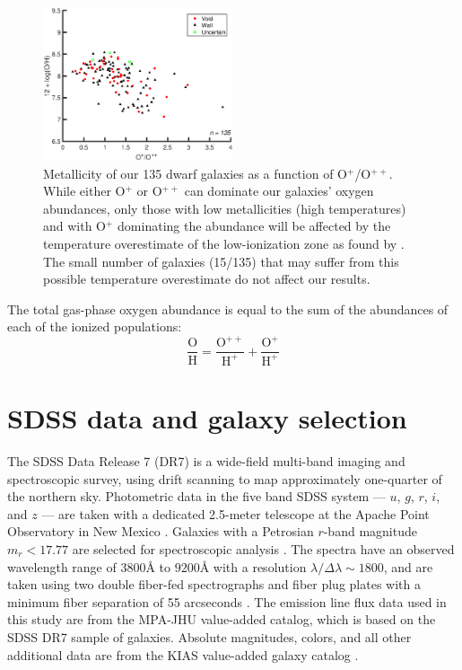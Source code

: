 \begin{figure}
    \includegraphics[width=0.5\textwidth]{Images/Paper1/1sig_I06_dwarf_SF_t3_OpOpp_Z12logOH}
    \caption[O$^+$/O$^{++}$ versus metallicity]{Metallicity of our 135 dwarf 
    galaxies as a function of O$^+$/O$^{++}$.  While either O$^+$ or O$^{++}$ 
    can dominate our galaxies' oxygen abundances, only those with low 
    metallicities (high temperatures) and with O$^+$ dominating the abundance 
    will be affected by the temperature overestimate of the low-ionization zone 
    as found by \cite{Andrews13}.  The small number of galaxies (15/135) that 
    may suffer from this possible temperature overestimate do not affect our 
    results.}
    \label{fig:O2O3_ratio}
\end{figure}  

The total gas-phase oxygen abundance is equal to the sum of the abundances of 
each of the ionized populations:
\begin{equation}
	\frac{\text{O}}{\text{H}} = \frac{\text{O}^{++}}{\text{H}^+} + \frac{\text{O}^+}{\text{H}^+}
\end{equation}



\section[Data]{SDSS data and galaxy selection}\label{sec:Data}
The SDSS Data Release 7 (DR7) \citep{Abazajian09} is a wide-field multi-band 
imaging and spectroscopic survey, using drift scanning to map approximately 
one-quarter of the northern sky.  Photometric data in the five band SDSS system 
--- $u$, $g$, $r$, $i$, and $z$ --- are taken with a dedicated 2.5-meter 
telescope at the Apache Point Observatory in New Mexico \citep{Fukugita96, 
Gunn98}.  Galaxies with a Petrosian $r$-band magnitude $m_r < 17.77$ are 
selected for spectroscopic analysis \citep{Lupton01, Strauss02}.  The spectra 
have an observed wavelength range of $3800\text{\AA}$ to $9200\text{\AA}$ with a 
resolution $\lambda / \Delta \lambda \sim 1800$, and are taken using two 
double fiber-fed spectrographs and fiber plug plates with a minimum fiber 
separation of 55 arcseconds \citep{Blanton03}.  The emission line flux data used 
in this study are from the MPA-JHU value-added catalog, which is based on the 
SDSS DR7 sample of galaxies.  Absolute magnitudes, colors, and all other 
additional data are from the KIAS value-added galaxy catalog \citep{Choi10}.


